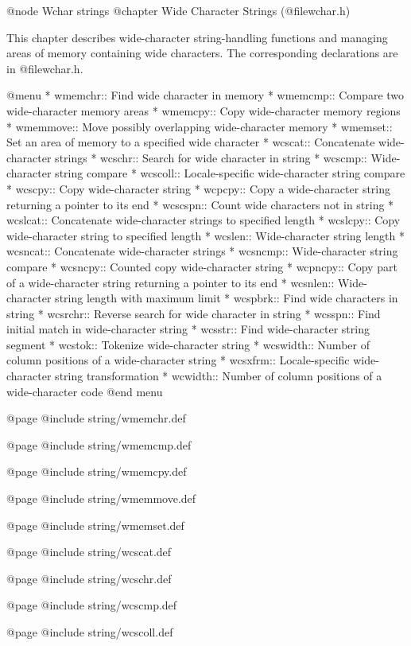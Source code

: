 @node Wchar strings
@chapter Wide Character Strings (@file{wchar.h})

This chapter describes wide-character string-handling functions and
managing areas of memory containing wide characters.  The corresponding 
declarations are in @file{wchar.h}.

@menu
* wmemchr::     Find wide character in memory
* wmemcmp::     Compare two wide-character memory areas
* wmemcpy::     Copy wide-character memory regions
* wmemmove::    Move possibly overlapping wide-character memory
* wmemset::     Set an area of memory to a specified wide character
* wcscat::      Concatenate wide-character strings
* wcschr::      Search for wide character in string
* wcscmp::      Wide-character string compare
* wcscoll::     Locale-specific wide-character string compare
* wcscpy::      Copy wide-character string
* wcpcpy::      Copy a wide-character string returning a pointer to its end
* wcscspn::     Count wide characters not in string
* wcslcat::     Concatenate wide-character strings to specified length
* wcslcpy::     Copy wide-character string to specified length
* wcslen::      Wide-character string length
* wcsncat::     Concatenate wide-character strings
* wcsncmp::     Wide-character string compare
* wcsncpy::     Counted copy wide-character string
* wcpncpy::     Copy part of a wide-character string returning a pointer to its end
* wcsnlen::     Wide-character string length with maximum limit
* wcspbrk::     Find wide characters in string
* wcsrchr::     Reverse search for wide character in string
* wcsspn::      Find initial match in wide-character string
* wcsstr::      Find wide-character string segment
* wcstok::      Tokenize wide-character string
* wcswidth::    Number of column positions of a wide-character string
* wcsxfrm::     Locale-specific wide-character string transformation
* wcwidth::     Number of column positions of a wide-character code
@end menu

@page
@include string/wmemchr.def

@page
@include string/wmemcmp.def

@page
@include string/wmemcpy.def

@page
@include string/wmemmove.def

@page
@include string/wmemset.def

@page
@include string/wcscat.def

@page
@include string/wcschr.def

@page
@include string/wcscmp.def

@page
@include string/wcscoll.def

